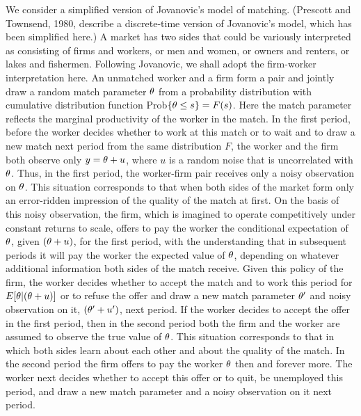  We consider a simplified version of Jovanovic's
model of matching.  (Prescott and Townsend, 1980, describe a discrete-time
version of Jovanovic's model, which has been simplified here.)  A market has
two sides that could be variously interpreted as consisting of firms and
workers, or men and women, or owners and renters, or lakes and fishermen.
Following Jovanovic, we shall adopt the firm-worker interpretation here.  An
unmatched worker and a firm form a pair and jointly draw a random match
parameter ${\theta}$ from a probability distribution with cumulative distribution
function Prob$\{{\theta}\le s\}=F(s)$.  Here the match parameter reflects the
marginal productivity of the worker in the match.  In the first period, before
the worker decides whether to work at this match or to wait and
to draw a new match next period from the same distribution $F$, the worker and
the firm both observe only $y={\theta}+u$, where $u$ is a random noise that is
uncorrelated with ${\theta}$.  Thus, in the first period, the worker-firm pair
receives only a noisy observation on ${\theta}$.  This situation corresponds to that
when both sides of the market form only an error-ridden impression of the
quality of the match at first.  On the basis of this noisy observation, the
firm, which is imagined to operate competitively under constant returns to
scale, offers to pay the worker the conditional expectation of ${\theta}$, given
$({\theta}+u)$, for the first period, with the understanding that in subsequent
periods it will pay the worker the expected value of ${\theta}$, depending on
whatever additional information both sides of the match
receive.%
Given this
policy of the firm, the worker decides whether to accept the match  and to work
this period for $E[{\theta}|({\theta}+u)]$  or to refuse the offer and draw a new match
parameter ${\theta}'$ and noisy observation on it, $({\theta}'+u')$, next period.  If
the worker decides to accept the offer in the first period, then in the second
period both the firm and the worker are assumed to observe the true value of
${\theta}$.  This situation corresponds  to that in which both sides learn about
each other and about the quality of the match.  In the second period the firm
offers to pay the worker ${\theta}$ then and forever more.  The worker next decides
whether to accept this offer or to quit, be unemployed this period, and
draw a new match parameter and a noisy observation on it next period.

